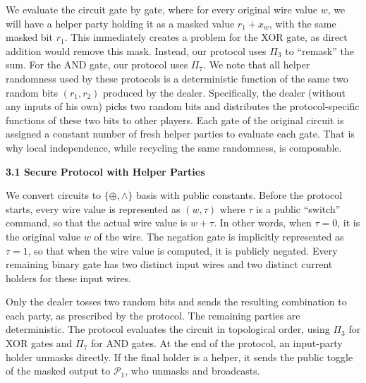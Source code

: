 \documentclass[10pt,a4paper]{article}
\begin{document}
We evaluate the circuit gate by gate, where for every original wire value $w$, we will have a helper party holding it as a masked value $r_{1}+x_{w}$, with the same masked bit $r_{1}$. This immediately creates a problem for the XOR gate, as direct addition would remove this mask. Instead, our protocol uses $\Pi_{3}$ to “remask” the sum. For the AND gate, our protocol uses $\Pi_{7}$. We note that all helper randomness used by these protocols is a deterministic function of the same two random bits $(r_{1},r_{2})$ produced by the dealer. Specifically, the dealer (without any inputs of his own) picks two random bits and distributes the protocol-specific functions of these two bits to other players. Each gate of the original circuit is assigned a constant number of fresh helper parties to evaluate each gate. That is why local independence, while recycling the same randomness, is composable.\par




\par\medskip\noindent\textbf{
3.1 Secure Protocol with Helper Parties}\par




We convert circuits to $\{\oplus,\wedge\}$ basis with public constants. Before the protocol starts, every wire value is represented as $(w,\tau)$ where $\tau$ is a public “switch” command, so that the actual wire value is $w+\tau$. In other words, when $\tau=0$, it is the original value $w$ of the wire. The negation gate is implicitly represented as $\tau=1$, so that when the wire value is computed, it is publicly negated.
Every remaining binary gate has two distinct input wires and two distinct current holders for these input wires.\par




Only the dealer tosses two random bits and sends the resulting combination to each party, as prescribed by the protocol. The remaining parties are deterministic. The protocol evaluates the circuit in topological order, using $\Pi_{3}$ for XOR gates and $\Pi_{7}$ for AND gates. At the end of the protocol, an input-party holder unmasks directly. If the final holder is a helper, it sends the public toggle of the masked output to $\mathcal{P}_{1}$, who unmasks and broadcasts.\par
\end{document}
